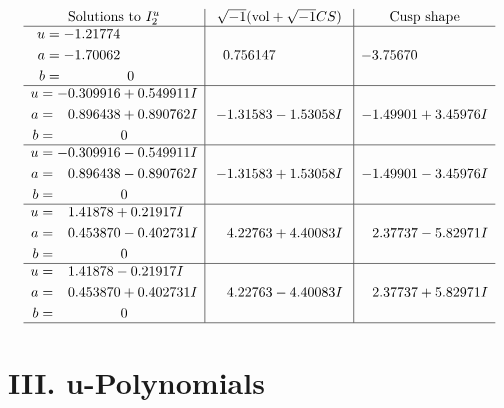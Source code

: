 \documentclass[1p]{elsarticle_modified}
\theoremstyle{definition}
\newcommand{\I}{\sqrt{-1}}
\begin{document}
$$\begin{array}{c|c|c}  
\text{Solutions to }I^u_{2}& \I (\text{vol} + \sqrt{-1}CS) & \text{Cusp shape}\\
 \hline 
\begin{aligned}
u &= -1.21774\phantom{ +0.000000I} \\
a &= -1.70062\phantom{ +0.000000I} \\
b &= \phantom{-0.000000 } 0\end{aligned}
 & \phantom{-}0.756147\phantom{ +0.000000I} & -3.75670\phantom{ +0.000000I} \\ \hline\begin{aligned}
u &= -0.309916 + 0.549911 I \\
a &= \phantom{-}0.896438 + 0.890762 I \\
b &= \phantom{-0.000000 } 0\end{aligned}
 & -1.31583 - 1.53058 I & -1.49901 + 3.45976 I \\ \hline\begin{aligned}
u &= -0.309916 - 0.549911 I \\
a &= \phantom{-}0.896438 - 0.890762 I \\
b &= \phantom{-0.000000 } 0\end{aligned}
 & -1.31583 + 1.53058 I & -1.49901 - 3.45976 I \\ \hline\begin{aligned}
u &= \phantom{-}1.41878 + 0.21917 I \\
a &= \phantom{-}0.453870 - 0.402731 I \\
b &= \phantom{-0.000000 } 0\end{aligned}
 & \phantom{-}4.22763 + 4.40083 I & \phantom{-}2.37737 - 5.82971 I \\ \hline\begin{aligned}
u &= \phantom{-}1.41878 - 0.21917 I \\
a &= \phantom{-}0.453870 + 0.402731 I \\
b &= \phantom{-0.000000 } 0\end{aligned}
 & \phantom{-}4.22763 - 4.40083 I & \phantom{-}2.37737 + 5.82971 I\\
 \hline 
 \end{array}$$\newpage
\newpage\renewcommand{\arraystretch}{1}
\centering \section*{ III. u-Polynomials}
\end{document}
